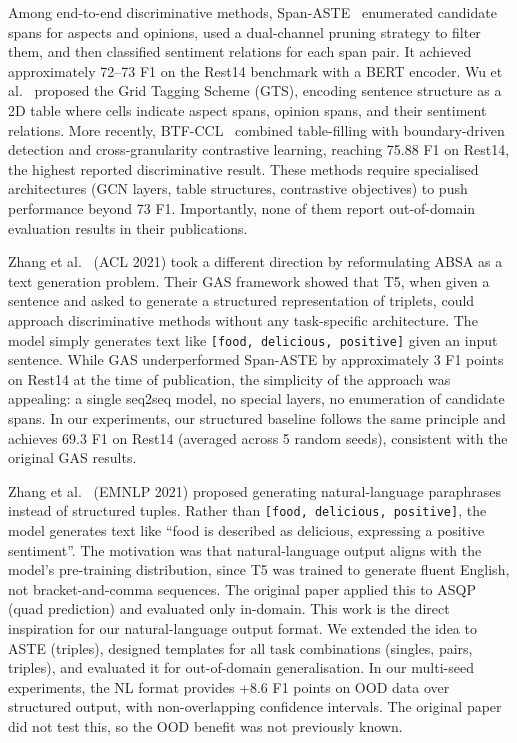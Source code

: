 \documentclass[12pt,a4paper]{report}
\begin{document}
Among end-to-end discriminative methods, Span-ASTE~\cite{xu2021learning} enumerated candidate spans for aspects and opinions, used a dual-channel pruning strategy to filter them, and then classified sentiment relations for each span pair. It achieved approximately 72--73 F1 on the Rest14 benchmark with a BERT encoder. Wu et al.~\cite{wu2020grid} proposed the Grid Tagging Scheme (GTS), encoding sentence structure as a 2D table where cells indicate aspect spans, opinion spans, and their sentiment relations. More recently, BTF-CCL~\cite{btfccl2025} combined table-filling with boundary-driven detection and cross-granularity contrastive learning, reaching 75.88 F1 on Rest14, the highest reported discriminative result. These methods require specialised architectures (GCN layers, table structures, contrastive objectives) to push performance beyond 73 F1. Importantly, none of them report out-of-domain evaluation results in their publications.

Zhang et al.~\cite{zhang2021towards} (ACL 2021) took a different direction by reformulating ABSA as a text generation problem. Their GAS framework showed that T5, when given a sentence and asked to generate a structured representation of triplets, could approach discriminative methods without any task-specific architecture. The model simply generates text like \texttt{[food, delicious, positive]} given an input sentence. While GAS underperformed Span-ASTE by approximately 3 F1 points on Rest14 at the time of publication, the simplicity of the approach was appealing: a single seq2seq model, no special layers, no enumeration of candidate spans. In our experiments, our structured baseline follows the same principle and achieves 69.3 F1 on Rest14 (averaged across 5 random seeds), consistent with the original GAS results.

Zhang et al.~\cite{zhang2021aspect} (EMNLP 2021) proposed generating natural-language paraphrases instead of structured tuples. Rather than \texttt{[food, delicious, positive]}, the model generates text like ``food is described as delicious, expressing a positive sentiment''. The motivation was that natural-language output aligns with the model's pre-training distribution, since T5 was trained to generate fluent English, not bracket-and-comma sequences. The original paper applied this to ASQP (quad prediction) and evaluated only in-domain. This work is the direct inspiration for our natural-language output format. We extended the idea to ASTE (triples), designed templates for all task combinations (singles, pairs, triples), and evaluated it for out-of-domain generalisation. In our multi-seed experiments, the NL format provides +8.6 F1 points on OOD data over structured output, with non-overlapping confidence intervals. The original paper did not test this, so the OOD benefit was not previously known.
\end{document}
